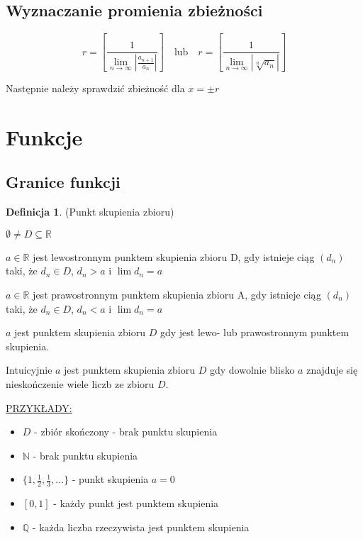 \documentclass{article}
\theoremstyle{definition}
\newtheorem{de}{Definicja}[subsection]
\theoremstyle{definition}
\theoremstyle{definition}
\begin{document}
\subsection{Wyznaczanie promienia zbieżności}

$$
r = \left[
    \frac{1}{
      \lim\limits_{n \to \infty} | \frac{a_{n+1}}{a_n} |
    }
    \right]
\quad
\text{lub}
\quad
r = \left[
    \frac{1}{
      \lim\limits_{n \to \infty} | \sqrt[n]{a_n} |
    }
    \right]
$$

Następnie należy sprawdzić zbieżność dla $ x= \pm r $

\section{Funkcje}

\subsection{Granice funkcji}

\begin{de}
(Punkt skupienia zbioru)

$ \emptyset \neq D \subseteq \mathbb{R} $

$a \in \mathbb{R}$ jest lewostronnym punktem skupienia zbioru D, gdy
istnieje ciąg $(d_n)$ taki, że $ d_n \in D $, $ d_n > a $ i $ \lim d_n = a $

$a \in \mathbb{R}$ jest prawostronnym punktem skupienia zbioru A, gdy
istnieje ciąg $(d_n)$ taki, że $ d_n \in D $, $ d_n < a $ i $ \lim d_n = a $

$a$ jest punktem skupienia zbioru $D$ gdy jest lewo- lub prawostronnym punktem skupienia.

Intuicyjnie $a$ jest punktem skupienia zbioru $D$ gdy dowolnie blisko
$a$ znajduje się nieskończenie wiele liczb ze zbioru $D$.
\end{de}

\underline{PRZYKŁADY:}

\begin{itemize}
\item $D$ - zbiór skończony - brak punktu skupienia
\item $\mathbb{N}$ - brak punktu skupienia
\item $ \{ 1, \frac{1}{2}, \frac{1}{3}, ...\} $ - punkt skupienia $a=0$
\item $[0,1]$ - każdy punkt jest punktem skupienia
\item $\mathbb{Q}$ - każda liczba rzeczywista jest punktem skupienia
\end{itemize}
\end{document}

